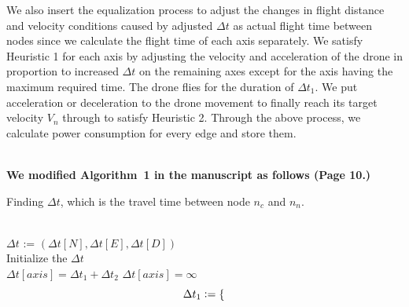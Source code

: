 \documentclass[onecolumn]{IEEEconf}
\let\oldnl\nl%
\newcommand{\nonl}{\renewcommand{\nl}{\let\nl\oldnl}}
\begin{document}
\begin{description}
\begin{mdframed} [ linewidth=.75pt, userdefinedwidth=0.9\textwidth]
{    We also insert the equalization process to adjust the changes in flight distance and velocity conditions caused by adjusted $\Delta t$ as actual flight time between nodes since we calculate the flight time of each axis separately.
    We satisfy Heuristic 1 for each axis by adjusting the velocity and acceleration of the drone in proportion to increased $\Delta t$ on the remaining axes except for the axis having the maximum required time.
    The drone flies for the duration of $\Delta t_1$. We put acceleration or deceleration to the drone movement to finally reach its target velocity $V_n$ through to satisfy Heuristic 2.
    Through the above process, we calculate power consumption for every edge and store them.
    }
    \end{mdframed}   
	~\\
	\textbf{We modified Algorithm~1 in the manuscript as follows (Page 10.)}~\\
\SetNlSty{}{\color{red}}{:}
\SetAlFnt{\color{red}}
\setcounter{algocf}{0}
\begin{algorithm}[htp]
\caption{Finding $\Delta t$, which is the travel time between node $n_c$ and $n_n$.}
\SetAlgoLined
{}
\nonl \hrulefill \\
$\Delta t$ := $(\Delta t[N], \Delta t[E], \Delta t[D])$ \\
Initialize the $\Delta t$ \\
  $\Delta t[axis] = \Delta t_1 + \Delta t_2$
{
{
$\Delta t[axis] = \infty $
 }
{ \begin{equation*}
\small{ \Delta t_1 :=
\begin{cases}

\end{cases}}
\end{equation*}}}
\end{algorithm}
\end{description}
\end{document}
